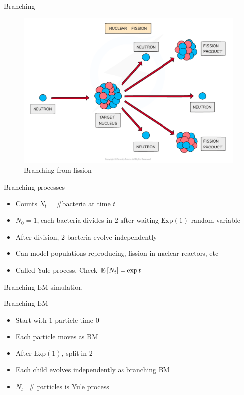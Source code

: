 \documentclass{beamer}
\begin{document}
\begin{frame}{Branching}
    \begin{figure}
        \centering
        \includegraphics[width=0.8\linewidth]{branching BM/fission.png}
        \caption{Branching from fission}
        \label{fig:enter-label}
    \end{figure}
\end{frame}


\begin{frame}{Branching processes}
    \begin{itemize}
        \item Counts $N_t=$\#bacteria at time $t$
        \item $N_0=1$, each bacteria divides in $2$ after waiting $\text{Exp}(1)$ random variable
        \item After division, $2$ bacteria evolve independently
        \item Can model populations reproducing, fission in nuclear reactors, etc
        \item Called Yule process, Check ${\mathbf E}\left[N_t\right]=\exp t$
    \end{itemize}
\end{frame}


\begin{frame}{Branching BM simulation}
    
\end{frame}


\begin{frame}{Branching BM}
    \begin{itemize}
        \item Start with $1$ particle time $0$
        \item Each particle moves as BM
        \item After $\text{Exp}(1)$, split in 2
        \item Each child evolves independently as branching BM
        \item $N_t$=\# particles is Yule process
    \end{itemize}
\end{frame}
\end{document}
